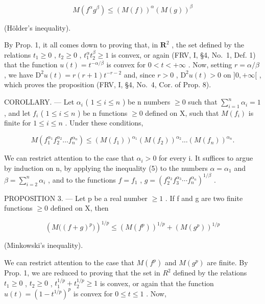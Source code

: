 \[
M (f ^ {\alpha} g ^ {\beta}) \leqslant (M (f)) ^ {\alpha} (M (g)) ^ {\beta}\tag{5}
\]

(Hölder's inequality).

By Prop. 1, it all comes down to proving that, in \(\mathbf{R}^2\) , the set defined by the relations \(t_1 \geqslant 0\) , \(t_2 \geqslant 0\) , \(t_1^\alpha t_2^\beta \geqslant 1\) is convex, or again (FRV, I, §4, No.~1, Def. 1) that the function \(u(t) = t^{-\alpha/\beta}\) is convex for \(0 < t < +\infty\) . Now, setting \(r = \alpha/\beta\) , we have \(\mathrm{D}^2 u(t) = r(r + 1)t^{-r - 2}\) and, since \(r > 0\) , \(\mathrm{D}^2 u(t) > 0\) on \(]0, +\infty[\) , which proves the proposition (FRV, I, §4, No.~4, Cor. of Prop. 8).

COROLLARY. --- Let \(\alpha_{i}\) ( \(1 \leqslant i \leqslant n\) ) be n numbers \(\geqslant 0\) such that \(\sum_{i=1}^{n} \alpha_{i} = 1\) , and let \(f_{i}\) ( \(1 \leqslant i \leqslant n\) ) be n functions \(\geqslant 0\) defined on X, such that \(M(f_{i})\) is finite for \(1 \leqslant i \leqslant n\) . Under these conditions,

\[
M \left(f _ {1} ^ {\alpha_ {1}} f _ {2} ^ {\alpha_ {2}} \dots f _ {n} ^ {\alpha_ {n}}\right) \leqslant \left(M (f _ {1})\right) ^ {\alpha_ {1}} \left(M (f _ {2})\right) ^ {\alpha_ {2}} \dots \left(M (f _ {n})\right) ^ {\alpha_ {n}}.\tag{6}
\]

We can restrict attention to the case that \(\alpha_{i} > 0\) for every i. It suffices to argue by induction on n, by applying the inequality (5) to the numbers \(\alpha = \alpha_{1}\) and \(\beta = \sum_{i=2}^{n} \alpha_{i}\) , and to the functions \(f = f_{1}\) , \(g = (f_{2}^{\alpha_{2}} f_{3}^{\alpha_{3}} \cdots f_{n}^{\alpha_{n}})^{1/\beta}\) .

PROPOSITION 3. --- Let p be a real number \(\geqslant 1\) . If f and g are two finite functions \(\geqslant 0\) defined on X, then

\[
\left(M \big ((f + g) ^ {p} \big)\right) ^ {1 / p} \leqslant \left(M (f ^ {p})\right) ^ {1 / p} + \left(M (g ^ {p})\right) ^ {1 / p}\tag{7}
\]

(Minkowski's inequality).

We can restrict attention to the case that \(M(f^{p})\) and \(M(g^{p})\) are finite. By Prop. 1, we are reduced to proving that the set in \(R^{2}\) defined by the relations \(t_{1} \geqslant 0\) , \(t_{2} \geqslant 0\) , \(t_{1}^{1/p} + t_{2}^{1/p} \geqslant 1\) is convex, or again that the function \(u(t) = (1 - t^{1/p})^{p}\) is convex for \(0 \leqslant t \leqslant 1\) . Now,

